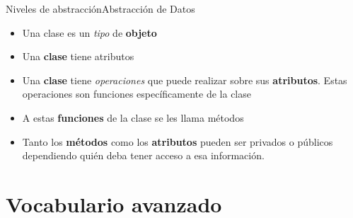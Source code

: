 \documentclass[spanish, c]{beamer}
\begin{document}
\begin{frame}{Niveles de abstracción}{Abstracción de Datos}
    
    \begin{itemize}[<+->]
        \itemsep2.5ex
        \item Una \alert{clase} es un \textit{tipo} de \textbf{objeto}
        \item Una \textbf{clase} tiene \alert{atributos}
        \item Una \textbf{clase} tiene \textit{operaciones} que puede realizar sobre sus \textbf{atributos}. Estas operaciones son \alert{funciones} específicamente de la clase
        \item A estas \textbf{funciones} de la clase se les llama \alert{métodos}
        \item Tanto los \textbf{métodos} como los \textbf{atributos} pueden ser \alert{privados} o \alert{públicos} dependiendo quién deba tener acceso a esa información.
    \end{itemize}
\end{frame}

\section{Vocabulario avanzado}
\end{document}
